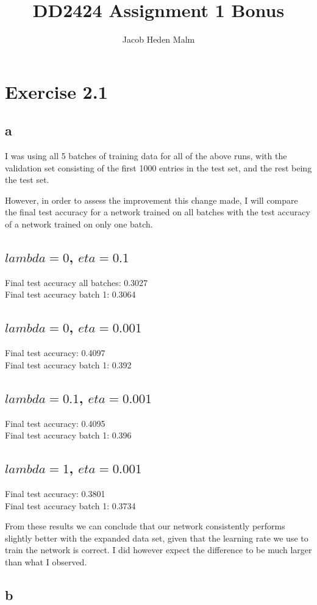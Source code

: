 \documentclass[11pt,a4paper]{article}
\author{Jacob Heden Malm}
\title{DD2424 Assignment 1 Bonus}
\begin{document}
\maketitle
\section{Exercise 2.1}

\subsection{a}
I was using all 5 batches of training data for all of the above runs, with the validation set consisting of the first 1000 entries in the test set, and the rest being the test set.

However, in order to assess the improvement this change made, I will compare the final test accuracy for a network trained on all batches with the test accuracy of a network trained on only one batch.

\subsection{$lambda=0$, $eta=0.1$}
Final test accuracy all batches: 0.3027\\
Final test accuracy batch 1: 0.3064

\subsection{$lambda=0$, $eta=0.001$}
Final test accuracy: 0.4097\\
Final test accuracy batch 1: 0.392


\subsection{$lambda=0.1$, $eta=0.001$}
Final test accuracy: 0.4095\\
Final test accuracy batch 1: 0.396


\subsection{$lambda=1$, $eta=0.001$}
Final test accuracy: 0.3801\\
Final test accuracy batch 1: 0.3734

From these results we can conclude that our network consistently performs slightly better with the expanded data set, given that the learning rate we use to train the network is correct. I did however expect the difference to be much larger than what I observed.

\subsection{b}
\end{document}
